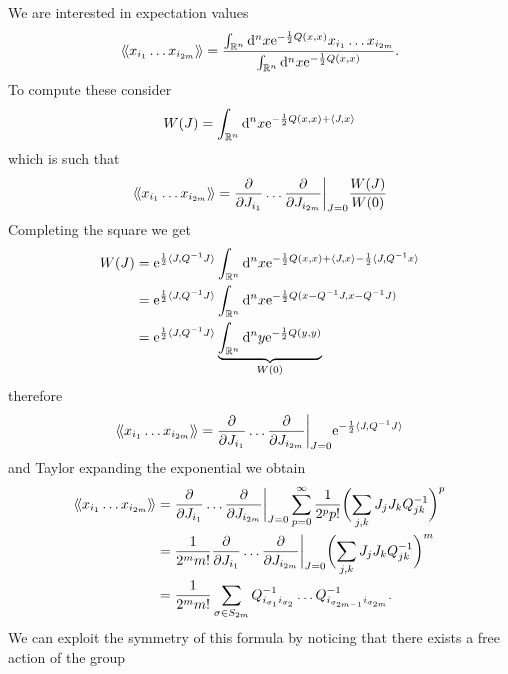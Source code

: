 We are interested in expectation values
\begin{equation*}
  \langle \! \langle {x_{i_1} \dots x_{i_{2m}}} \rangle \! \rangle
  = \frac{
    \int_{\mathbb{R}^n} \mathrm{d}^n x \mathrm{e}^{-\frac{1}{2}Q(x, x)} x_{i_1} \dots x_{i_{2m}}
  }{
    \int_{\mathbb{R}^n} \mathrm{d}^n x \mathrm{e}^{-\frac{1}{2}Q(x, x)}
  }.
\end{equation*}
To compute these consider
\begin{equation*}
  W(J) = \int_{\mathbb{R}^n} \mathrm{d}^n x \mathrm{e}^{-\frac{1}{2} Q(x, x) + \langle J, x \rangle}
\end{equation*}
which is such that
\begin{equation*}
  \langle \! \langle {x_{i_1} \dots x_{i_{2m}}} \rangle \! \rangle
  = \frac{\partial}{\partial J_{i_1}} \dots \frac{\partial}{\partial J_{i_{2m}}} \bigg|_{J = 0}
  \frac{W(J)}{W(0)}
\end{equation*}
Completing the square we get
\begin{align*}
  W(J) 
  &= \mathrm{e}^{\frac{1}{2} \langle J, Q^{-1} J \rangle}
  \int_{\mathbb{R}^n} \mathrm{d}^n x
  \mathrm{e}^{-\frac{1}{2} Q(x, x) + \langle J, x \rangle - \frac{1}{2} \langle J, Q^{-1} x \rangle} \\
  &= \mathrm{e}^{\frac{1}{2} \langle J, Q^{-1} J \rangle}
  \int_{\mathbb{R}^n} \mathrm{d}^n x
  \mathrm{e}^{- \frac{1}{2} Q (x - Q^{-1} J, x - Q^{-1} J) } \\
  &= \mathrm{e}^{\frac{1}{2} \langle J, Q^{-1} J \rangle}
  \underbrace{\int_{\mathbb{R}^n} \mathrm{d}^n y \mathrm{e}^{- \frac{1}{2} Q (y, y) }}_{W(0)}
\end{align*}
therefore
 \begin{equation*}
  \langle \! \langle {x_{i_1} \dots x_{i_{2m}}} \rangle \! \rangle
  = \frac{\partial}{\partial J_{i_1}} \dots \frac{\partial}{\partial J_{i_{2m}}} \bigg|_{J = 0}
  \mathrm{e}^{-\frac{1}{2} \langle J, Q^{-1} J \rangle}
\end{equation*}
and Taylor expanding the exponential we obtain
\begin{align*}
  \langle \! \langle {x_{i_1} \dots x_{i_{2m}}} \rangle \! \rangle
  &= \frac{\partial}{\partial J_{i_1}} \dots \frac{\partial}{\partial J_{i_{2m}}} \bigg|_{J = 0}
  \sum_{p = 0}^\infty \frac{1}{2^p p!}
  \biggl( \sum_{j, k} J_j J_k Q_{jk}^{-1} \biggr)^p \\
  &= \frac{1}{2^m m!} \frac{\partial}{\partial J_{i_1}} \dots \frac{\partial}{\partial J_{i_{2m}}} \bigg|_{J = 0}
  \biggl( \sum_{j, k} J_j J_k Q_{jk}^{-1} \biggr)^m \\
  &= \frac{1}{2^m m!} \sum_{\sigma \in S_{2m}} Q_{i_{\sigma_1} i_{\sigma_2}}^{-1} \dots
  Q_{i_{\sigma_{2m-1}} i_{\sigma_{2m}}}^{-1}.
\end{align*}
We can exploit the symmetry of this formula by noticing that there exists a free action of the group
